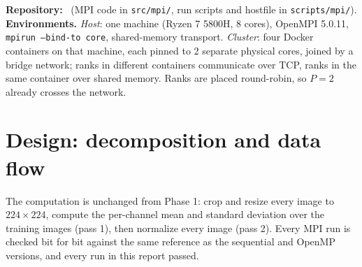 \documentclass{zc-ust-hw}
\begin{document}
\maketitle

\noindent\textbf{Repository:} \repo\ (MPI code in \texttt{src/mpi/}, run scripts and hostfile
in \texttt{scripts/mpi/}).\\
\textbf{Environments.} \emph{Host}: one machine (Ryzen 7 5800H, 8 cores), OpenMPI 5.0.11,
\texttt{mpirun --bind-to core}, shared-memory transport. \emph{Cluster}: four Docker containers on
that machine, each pinned to 2 separate physical cores, joined by a bridge network; ranks in
different containers communicate over TCP, ranks in the same container over shared memory.
Ranks are placed round-robin, so $P=2$ already crosses the network.

\section{Design: decomposition and data flow}

The computation is unchanged from Phase 1: crop and resize every image to $224\times224$,
compute the per-channel mean and standard deviation over the training images (pass 1), then
normalize every image (pass 2). Every MPI run is checked bit for bit against the same
reference as the sequential and OpenMP versions, and every run in this report passed.
\end{document}
